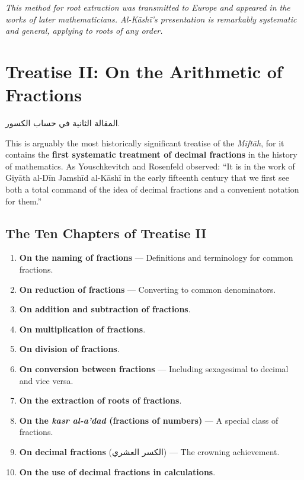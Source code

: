 \documentclass[11pt,a4paper]{article}
\newenvironment{arabicbox}{%
  \begin{framed}
  \begin{minipage}{\dimexpr\linewidth-2\fboxsep-2\fboxrule\relax}
  \setlength{\parindent}{0pt}
  \linespread{1.3}\selectfont
}{%
  \end{minipage}
  \end{framed}
}
\newcommand{\cnote}[1]{\textcolor{notecolor}{\textit{#1}}}
\newcommand{\ar}[1]{{\arabicfont\beginR #1\endR}}
\begin{document}
\cnote{This method for root extraction was transmitted to Europe and
appeared in the works of later mathematicians. Al-K\=ash\=i's presentation
is remarkably systematic and general, applying to roots of any order.}
\clearpage

\section{Treatise II: On the Arithmetic of Fractions}
\label{sec:treatise2}

\begin{arabicbox}
\begin{Arabic}
المقالة الثانية في حساب الكسور.
\end{Arabic}
\end{arabicbox}

\vspace{0.3cm}

\noindent This is arguably the most historically significant treatise of
the \textit{Mift\=ah}, for it contains the \textbf{first systematic
treatment of decimal fractions} in the history of mathematics. As
Youschkevitch and Rosenfeld observed: ``It is in the work of Giy\=ath
al-D\=in Jamsh\=id al-K\=ash\=i in the early fifteenth century that we first see
both a total command of the idea of decimal fractions and a convenient
notation for them.''

\subsection{The Ten Chapters of Treatise II}

\begin{enumerate}[label=\textbf{Ch.\arabic*:}]
  \item \textbf{On the naming of fractions} --- Definitions and
  terminology for common fractions.
  \item \textbf{On reduction of fractions} --- Converting to common
  denominators.
  \item \textbf{On addition and subtraction of fractions}.
  \item \textbf{On multiplication of fractions}.
  \item \textbf{On division of fractions}.
  \item \textbf{On conversion between fractions} --- Including sexagesimal
  to decimal and vice versa.
  \item \textbf{On the extraction of roots of fractions}.
  \item \textbf{On the \textit{kasr al-a'dad} (fractions of numbers)} ---
  A special class of fractions.
  \item \textbf{On decimal fractions} (\ar{الكسر العشري}) --- The
  crowning achievement.
  \item \textbf{On the use of decimal fractions in calculations}.
\end{enumerate}
\end{document}
